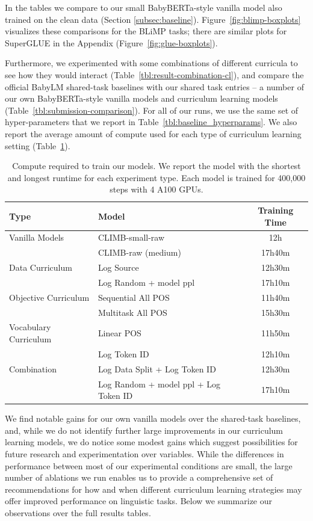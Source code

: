In the tables we compare to our small BabyBERTa-style vanilla model also trained on the clean data (Section \ref{subsec:baseline}). Figure~\ref{fig:blimp-boxplots} visualizes these comparisons for the BLiMP tasks; there are  similar plots for SuperGLUE in the Appendix (Figure~\ref{fig:glue-boxplots}).

Furthermore, we experimented with some combinations of different curricula to see how they would interact (Table~\ref{tbl:result-combination-cl}), and compare the official BabyLM shared-task baselines with our shared task entries -- a number of our own BabyBERTa-style vanilla models and curriculum learning models (Table~\ref{tbl:submission-comparison}). For all of our runs, we use the same set of hyper-parameters that we report in Table~\ref{tbl:baseline_hyperparams}. We also report the average amount of compute used for each type of curriculum learning setting (Table~\ref{tbl:compute}).

\begin{table}
    \centering
    \small
    \begin{tabular}{llc}
    \toprule
         Type & Model & Training Time \\
    \midrule
         Vanilla Models & CLIMB-small-raw & 12h \\
         & CLIMB-raw (medium) & 17h40m \\
    \midrule
         Data Curriculum & Log Source & 12h30m \\
         & Log Random + model ppl & 17h10m \\
         Objective Curriculum & Sequential All POS & 11h40m \\
         & Multitask All POS & 15h30m \\
         Vocabulary Curriculum & Linear POS & 11h50m \\
         & Log Token ID & 12h10m \\
    \midrule
        Combination & Log Data Split + Log Token ID & 12h30m \\
        & Log Random + model ppl + Log Token ID & 17h10m \\
    \bottomrule
    \end{tabular}
    \caption{Compute required to train our models. We report the model with the shortest and longest runtime for each experiment type. Each model is trained for 400,000 steps with 4 A100 GPUs.}
    \label{tbl:compute}
\end{table}

We find notable gains for our own vanilla models over the shared-task baselines, and, while we do not identify further large improvements in our curriculum learning models, we do notice some modest gains which suggest possibilities for future research and experimentation over variables. While the differences in performance between most of our experimental conditions are small, the large number of ablations we run enables us to provide a comprehensive set of recommendations for how and when different curriculum learning strategies may offer improved performance on linguistic tasks.
Below we summarize our observations over the full results tables.


